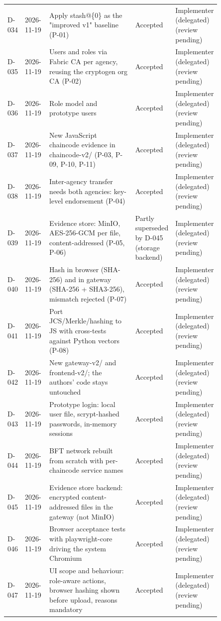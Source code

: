 \begin{longtable}{@{}lp{0.12\linewidth}p{0.47\linewidth}p{0.13\linewidth}p{0.13\linewidth}@{}}
D-034 & 2026-11-19 & Apply stash@\{0\} as the "improved v1" baseline (P-01) & Accepted & Implementer (delegated) (review pending)\\
D-035 & 2026-11-19 & Users and roles via Fabric CA per agency, reusing the cryptogen org CA (P-02) & Accepted & Implementer (delegated) (review pending)\\
D-036 & 2026-11-19 & Role model and prototype users & Accepted & Implementer (delegated) (review pending)\\
D-037 & 2026-11-19 & New JavaScript chaincode evidence in chaincode-v2/ (P-03, P-09, P-10, P-11) & Accepted & Implementer (delegated) (review pending)\\
D-038 & 2026-11-19 & Inter-agency transfer needs both agencies: key-level endorsement (P-04) & Accepted & Implementer (delegated) (review pending)\\
D-039 & 2026-11-19 & Evidence store: MinIO, AES-256-GCM per file, content-addressed (P-05, P-06) & Partly superseded by D-045 (storage backend) & Implementer (delegated) (review pending)\\
D-040 & 2026-11-19 & Hash in browser (SHA-256) and in gateway (SHA-256 + SHA3-256), mismatch rejected (P-07) & Accepted & Implementer (delegated) (review pending)\\
D-041 & 2026-11-19 & Port JCS/Merkle/hashing to JS with cross-tests against Python vectors (P-08) & Accepted & Implementer (delegated) (review pending)\\
D-042 & 2026-11-19 & New gateway-v2/ and frontend-v2/; the authors' code stays untouched & Accepted & Implementer (delegated) (review pending)\\
D-043 & 2026-11-19 & Prototype login: local user file, scrypt-hashed passwords, in-memory sessions & Accepted & Implementer (delegated) (review pending)\\
D-044 & 2026-11-19 & BFT network rebuilt from scratch with per-chaincode service names & Accepted & Implementer (delegated) (review pending)\\
D-045 & 2026-11-19 & Evidence store backend: encrypted content-addressed files in the gateway (not MinIO) & Accepted & Implementer (delegated) (review pending)\\
D-046 & 2026-11-19 & Browser acceptance tests with playwright-core driving the system Chromium & Accepted & Implementer (delegated) (review pending)\\
D-047 & 2026-11-19 & UI scope and behaviour: role-aware actions, browser hashing shown before upload, reasons mandatory & Accepted & Implementer (delegated) (review pending)\\

\end{longtable}
